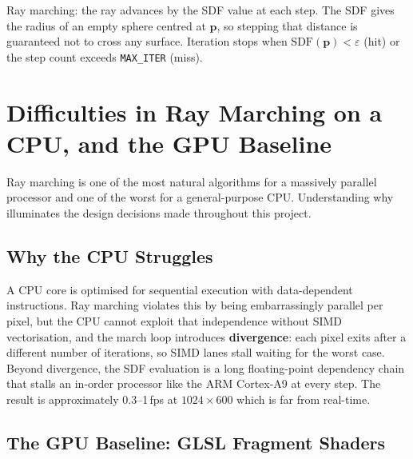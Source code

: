 \begin{figure}[h!]
\label{fig:raymarching}
\end{figure}
Ray marching: the ray advances by the SDF value at each step.
The SDF gives the radius of an empty sphere centred at $\mathbf{p}$,
so stepping that distance is guaranteed not to cross any surface.
Iteration stops when $\mathrm{SDF}(\mathbf{p}) < \varepsilon$ (hit) or
the step count exceeds \texttt{MAX\_ITER} (miss).

\section{Difficulties in Ray Marching on a CPU, and the GPU Baseline}

Ray marching is one of the most natural algorithms for a massively parallel
processor and one of the worst for a general-purpose CPU. Understanding why
illuminates the design decisions made throughout this project.

\subsection{Why the CPU Struggles}

A CPU core is optimised for sequential execution with data-dependent
instructions. Ray marching violates this by being embarrassingly parallel per
pixel, but the CPU cannot exploit that independence without SIMD vectorisation,
and the march loop introduces \textbf{divergence}: each pixel exits after a
different number of iterations, so SIMD lanes stall waiting for the worst case.
Beyond divergence, the SDF evaluation is a long floating-point dependency chain
that stalls an in-order processor like the ARM Cortex-A9 at every step. The
result is approximately 0.3--1\,fps at $1024\times600$ which is far from real-time.

\subsection{The GPU Baseline: GLSL Fragment Shaders}

